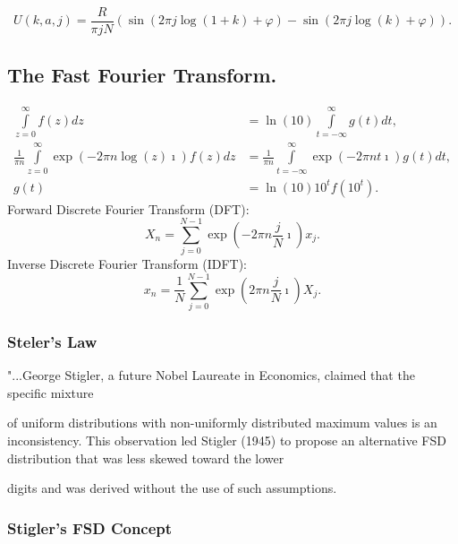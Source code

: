 \documentclass[titlepage,fleqn]{article}%
\begin{document}
\[
U(k,a,j)=\frac{R}{\pi jN}\left(  \sin\left(  2\pi j\log\left(  1+k\right)
+\varphi\right)  -\sin\left(  2\pi j\log\left(  k\right)  +\varphi\right)
\right)  .
\]


\subsection{The Fast Fourier Transform.}%

\begin{align*}%
{\displaystyle\int\limits_{z=0}^{\infty}}
f(z)dz  &  =\ln(10)%
{\displaystyle\int\limits_{t=-\infty}^{\infty}}
g(t)dt,\\
\frac{1}{\pi n}%
{\displaystyle\int\limits_{z=0}^{\infty}}
\exp(-2\pi n\log(z)\imath)f(z)dz  &  =\frac{1}{\pi n}%
{\displaystyle\int\limits_{t=-\infty}^{\infty}}
\exp(-2\pi nt\imath)g(t)dt,\\
g(t)  &  =\ln(10)10^{t}f(10^{t}).
\end{align*}
Forward Discrete Fourier Transform (DFT):%
\[
X_{n}=%
{\displaystyle\sum\limits_{j=0}^{N-1}}
\exp\left(  -2\pi n\frac{j}{N}\imath\right)  x_{j}.
\]
Inverse Discrete Fourier Transform (IDFT):%
\[
x_{n}=\frac{1}{N}%
{\displaystyle\sum\limits_{j=0}^{N-1}}
\exp\left(  2\pi n\frac{j}{N}\imath\right)  X_{j}.
\]


\subsubsection{Steler's Law}

"...George Stigler, a future Nobel Laureate in Economics, claimed that the
specific mixture

of uniform distributions with non-uniformly distributed maximum values is an
inconsistency. This observation led Stigler (1945) to propose an alternative
FSD distribution that was less skewed toward the lower

digits and was derived without the use of such assumptions.

\subsubsection{\bigskip Stigler's FSD Concept}
\end{document}
